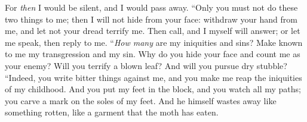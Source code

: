 \begin{biblechapter}
For \textit{then} I would be silent, and I would pass away.
 “Only you must not do these two things to me; 
then I will not hide from your face:
\verse withdraw your hand from me, 
and let not your dread terrify me.
\verse Then call, and I myself will answer; 
or let me speak, then reply to me.
\verse “\textit{How many} are my iniquities and sins? 
Make known to me my transgression and my sin.
\verse Why do you hide your face 
and count me as your enemy?
\verse Will you terrify a blown leaf? 
And will you pursue dry stubble?
\verse “Indeed, you write bitter things against me, 
and you make me reap the iniquities of my childhood.
\verse And you put my feet in the block, 
and you watch all my paths; 
you carve a mark on the soles of my feet.
\verse And he himself wastes away like something rotten, 
like a garment that the moth has eaten.
\end{biblechapter}

